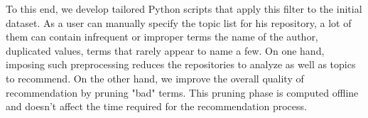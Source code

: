 To this end, we develop tailored Python scripts that apply this filter to the initial dataset. As a \GH user can manually specify the topic list for his repository, a lot of them can contain infrequent or improper terms \ie the name of the author, duplicated values, terms that rarely appear to name a few. On one hand, imposing such preprocessing reduces the repositories to analyze as well as topics to recommend. On the other hand, we improve the overall quality of recommendation by pruning "bad" terms. 
This pruning phase is computed offline and doesn't affect the time required for the recommendation process. 






